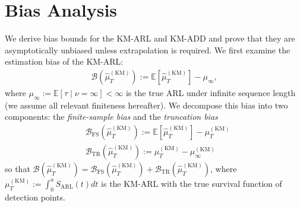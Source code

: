 \documentclass{article}
\theoremstyle{plain}
\theoremstyle{definition}
\theoremstyle{remark}
\def\mbe{\mathbb{E}}
\begin{document}
\section{Bias Analysis} \label{sec:Bias Analysis}
We derive bias bounds for the KM-ARL and KM-ADD and prove that they are asymptotically unbiased unless extrapolation is required. 
We first examine the estimation bias of the KM-ARL:
\begin{align}
    \mathcal{B}(\hat{\mu}_T^\mathrm{(KM)}) 
    := \mbe[\hat{\mu}_T^\mathrm{(KM)}] - \mu_\infty, 
\end{align}
where $\mu_\infty := \mbe[\tau \mid \nu=\infty] < \infty$ is the true ARL under infinite sequence length (we assume all relevant finiteness hereafter).
We decompose this bias into two components: 
the \textit{finite-sample bias} and the \textit{truncation bias} 
\begin{align}
    &\mathcal{B}_\mathrm{FS} (\hat{\mu}_T^\mathrm{(KM)}) := \mbe[\hat{\mu}_T^\mathrm{(KM)}] - \mu_T^\mathrm{(KM)} \\
    &\mathcal{B}_\mathrm{TR}(\hat{\mu}_T^\mathrm{(KM)}) := \mu_T^\mathrm{(KM)} - \mu_\infty^\mathrm{(KM)}
\end{align}
so that $\mathcal{B}(\hat{\mu}_T^\mathrm{(KM)}) = \mathcal{B}_\mathrm{FS}(\hat{\mu}_T^\mathrm{(KM)})  + \mathcal{B}_\mathrm{TR}(\hat{\mu}_T^\mathrm{(KM)})$, 
where $\mu_T^\mathrm{(KM)} := \int_0^{a} S_\mathrm{ARL}(t)dt$ is the KM-ARL with the true survival function of detection points.
\end{document}
